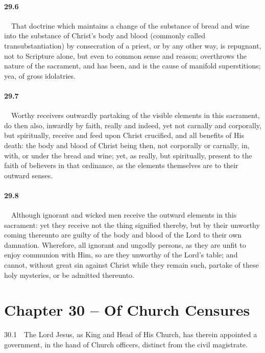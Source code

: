 \paragraph{29.6}\ \ That doctrine which maintains a change of the substance of bread and wine into the substance of Christ's body and blood (commonly called transubstantiation) by consecration of a priest, or by any other way, is repugnant, not to Scripture alone, but even to common sense and reason; overthrows the nature of the sacrament, and has been, and is the cause of manifold superstitions; yea, of gross idolatries.   
\bigskip
\paragraph{29.7}\ \ Worthy receivers outwardly partaking of the visible elements in this sacrament, do then also, inwardly by faith, really and indeed, yet not carnally and corporally, but spiritually, receive and feed upon Christ crucified, and all benefits of His death: the body and blood of Christ being then, not corporally or carnally, in, with, or under the bread and wine; yet, as really, but spiritually, present to the faith of believers in that ordinance, as the elements themselves are to their outward senses.   
\bigskip
\paragraph{29.8}\ \ Although ignorant and wicked men receive the outward elements in this sacrament: yet they receive not the thing signified thereby, but by their unworthy coming thereunto are guilty of the body and blood of the Lord to their own damnation. Wherefore, all ignorant and ungodly persons, as they are unfit to enjoy communion with Him, so are they unworthy of the Lord's table; and cannot, without great sin against Christ while they remain such, partake of these holy mysteries, or be admitted thereunto.  

\section{Chapter 30 -- Of Church Censures} 30.1\ \ The Lord Jesus, as King and Head of His Church, has therein appointed a government, in the hand of Church officers, distinct from the civil magistrate.   
\bigskip
